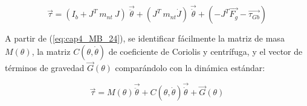         \begin{equation}
              \overrightarrow{ \tau}= \left( I_{b}+J^{T}~m_{nt}~J \right) ~\overrightarrow{\ddot{ \theta }}+ \left( J^{T}~m_{nt}\dot{J} \right) ~\overrightarrow{\dot{ \theta }}+ \left( - J^{T}\overrightarrow{F_{g}}-\overrightarrow{ \tau_{Gb}} \right)  
              \label{eq:cap4_MB_24}
        \end{equation}
        
        
        A partir de (\ref{eq:cap4_MB_24}), se identificar fácilmente la matriz de masa  $ M \left(  \theta  \right)$, la matriz  $ C \left(  \theta ,\dot{ \theta } \right)  $  de coeficiente de Coriolis y centrífuga, y el vector de términos de gravedad  $ \overrightarrow{G} \left(  \theta  \right)  $  comparándolo con la dinámica estándar:
        
        \begin{equation}
              \overrightarrow{ \tau}=M \left(  \theta  \right) \overrightarrow{\ddot{ \theta }}+C \left(  \theta ,\dot{ \theta } \right) \overrightarrow{\dot{ \theta }}+ \overrightarrow{G} \left(  \theta  \right) 
                \label{eq:cap4_MB_25}
        \end{equation}
        
